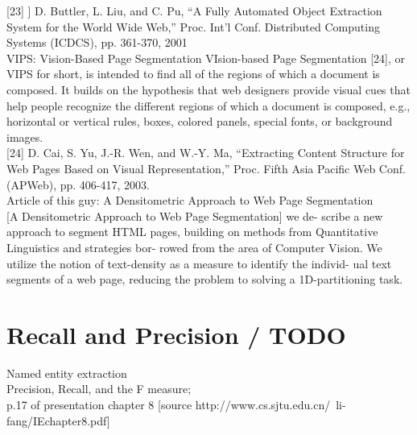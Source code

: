 [23] ] D. Buttler, L. Liu, and C. Pu, “A Fully Automated Object
Extraction System for the World Wide Web,” Proc. Int’l Conf.
Distributed Computing Systems (ICDCS), pp. 361-370, 2001\\



VIPS: Vision-Based Page Segmentation
VIsion-based Page Segmentation [24], or VIPS for short, is
intended to find all of the regions of which a document is
composed. It builds on the hypothesis that web designers
provide visual cues that help people recognize the different
regions of which a document is composed, e.g., horizontal
or vertical rules, boxes, colored panels, special fonts, or
background images. \\
\cite{Vips} [24] D. Cai, S. Yu, J.-R. Wen, and W.-Y. Ma, “Extracting Content
Structure for Web Pages Based on Visual Representation,” Proc.
Fifth Asia Pacific Web Conf. (APWeb), pp. 406-417, 2003.\\

Article of this guy: A Densitometric Approach to Web Page Segmentation\\

\cite{Kohlschutter} [A Densitometric Approach to Web Page Segmentation] we de- scribe a new approach to segment HTML pages, building on methods from Quantitative Linguistics and strategies bor- rowed from the area of Computer Vision. We utilize the notion of text-density as a measure to identify the individ- ual text segments of a web page, reducing the problem to solving a 1D-partitioning task.\\



\section{Recall and Precision / TODO}

Named entity extraction\\
Precision, Recall, and the
F measure;\\
p.17 of presentation
\cite{MoensBook} chapter 8 [source http://www.cs.sjtu.edu.cn/~li-fang/IEchapter8.pdf]

